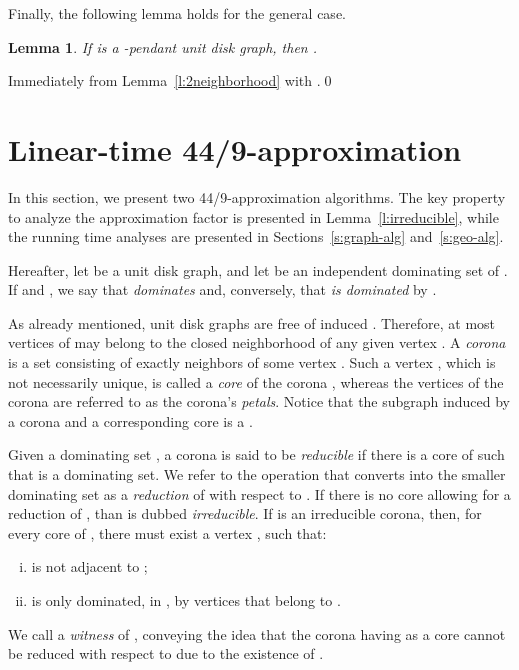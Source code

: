 \documentclass[preprint,12pt]{elsarticle}
\newtheorem{lem}[thm]{Lemma}
\begin{document}
Finally, the following lemma holds for the general case.

\begin{lem} \label{l:kl-pendant}
If  is a -pendant unit disk graph, then .
\end{lem}
\begin{pf}
Immediately from Lemma~\ref{l:2neighborhood} with .\qed
\end{pf}


\section{Linear-time 44/9-approximation} \label{s:algorithm}

In this section, we present two 44/9-approximation algorithms. The key property to analyze the approximation factor is presented in Lemma~\ref{l:irreducible}, while the running time analyses are presented in Sections~\ref{s:graph-alg} and~\ref{s:geo-alg}.

Hereafter, let  be a unit disk graph, and let  be an independent dominating set of . If  and , we say that  \emph{dominates}  and, conversely, that  \emph{is dominated} by .

As already mentioned, unit disk graphs are free of induced . Therefore, at most  vertices of  may belong to the closed neighborhood of any given vertex . A \emph{corona} is a set  consisting of exactly  neighbors of some vertex . Such a vertex , which is not necessarily unique, is called a \emph{core} of the corona , whereas the  vertices of the corona are referred to as the corona's \emph{petals}. Notice that the subgraph induced by a corona  and a corresponding core  is a .

Given a dominating set , a corona  is said to be \emph{reducible} if there is a core  of  such that  is a dominating set. 
We refer to the operation that converts  into the smaller dominating set  as a \emph{reduction} of  with respect to . If there is no core allowing for a reduction of , than  is dubbed \emph{irreducible}. 
If  is an irreducible corona, then, for every core  of , 
there must exist a vertex , such that:
\begin{enumerate}[(i)]
\item  is not adjacent to ;
\item  is only dominated, in , by vertices that belong to .
\end{enumerate}
We call  a \emph{witness} of , conveying the idea that the corona having  as a core cannot be reduced with respect to  due to the existence of . 
\end{document}
